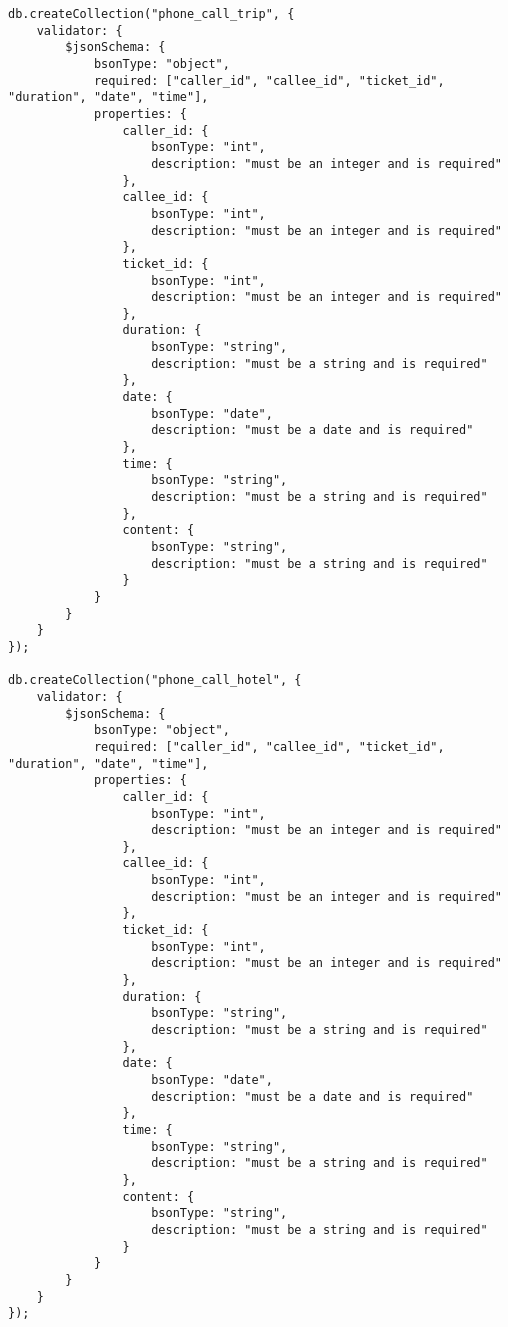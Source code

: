 \begin{lstlisting}
db.createCollection("phone_call_trip", {
	validator: {
		$jsonSchema: {
			bsonType: "object",
			required: ["caller_id", "callee_id", "ticket_id", "duration", "date", "time"],
			properties: {
				caller_id: {
					bsonType: "int",
					description: "must be an integer and is required"
				},
				callee_id: {
					bsonType: "int",
					description: "must be an integer and is required"
				},
				ticket_id: {
					bsonType: "int",
					description: "must be an integer and is required"
				},
				duration: {
					bsonType: "string",
					description: "must be a string and is required"
				},
				date: {
					bsonType: "date",
					description: "must be a date and is required"
				},
				time: {
					bsonType: "string",
					description: "must be a string and is required"
				},
				content: {
					bsonType: "string",
					description: "must be a string and is required"
				}
			}
		}
	}
});

db.createCollection("phone_call_hotel", {
	validator: {
		$jsonSchema: {
			bsonType: "object",
			required: ["caller_id", "callee_id", "ticket_id", "duration", "date", "time"],
			properties: {
				caller_id: {
					bsonType: "int",
					description: "must be an integer and is required"
				},
				callee_id: {
					bsonType: "int",
					description: "must be an integer and is required"
				},
				ticket_id: {
					bsonType: "int",
					description: "must be an integer and is required"
				},
				duration: {
					bsonType: "string",
					description: "must be a string and is required"
				},
				date: {
					bsonType: "date",
					description: "must be a date and is required"
				},
				time: {
					bsonType: "string",
					description: "must be a string and is required"
				},
				content: {
					bsonType: "string",
					description: "must be a string and is required"
				}
			}
		}
	}
});
\end{lstlisting}
\setRTL

